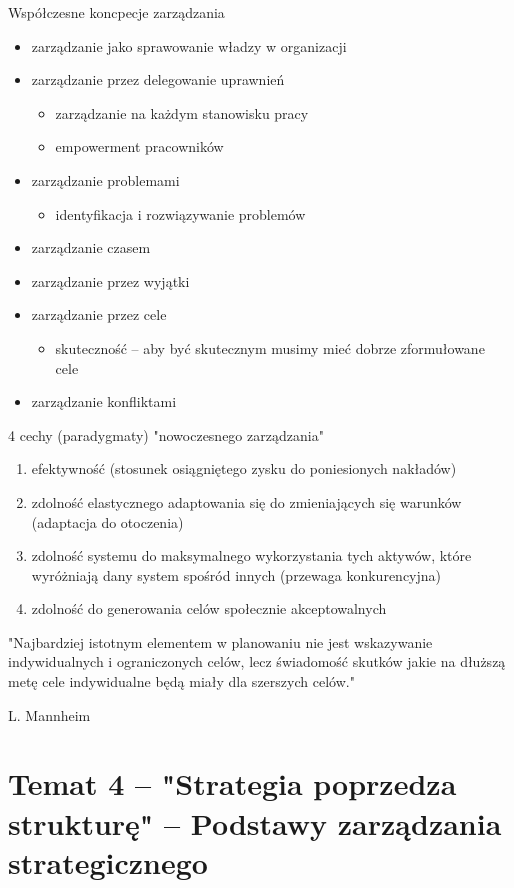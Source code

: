 \documentclass[a4paper,10pt]{report}
\begin{document}
Współczesne koncpecje zarządzania
\begin{itemize}
	\item zarządzanie jako sprawowanie władzy w organizacji
	\item zarządzanie przez delegowanie uprawnień
	\begin{itemize}
		\item zarządzanie na każdym stanowisku pracy
		\item empowerment pracowników
	\end{itemize}
	\item zarządzanie problemami
	\begin{itemize}
		\item identyfikacja i rozwiązywanie problemów
	\end{itemize}
	\item zarządzanie czasem
	\item zarządzanie przez wyjątki
	\item zarządzanie przez cele
	\begin{itemize}
		\item skuteczność -- aby być skutecznym musimy mieć dobrze zformułowane cele
	\end{itemize}
	\item zarządzanie konfliktami
\end{itemize}

4 cechy (paradygmaty) "nowoczesnego zarządzania"
\begin{enumerate}
	\item efektywność (stosunek osiągniętego zysku do poniesionych nakładów)
	\item zdolność elastycznego adaptowania się do zmieniających się warunków (adaptacja do otoczenia)
	\item zdolność systemu do maksymalnego wykorzystania tych aktywów, które wyróżniają dany system spośród innych (przewaga konkurencyjna)
	\item zdolność do generowania celów społecznie akceptowalnych
\end{enumerate}

"Najbardziej istotnym elementem w planowaniu nie jest wskazywanie indywidualnych i ograniczonych celów, lecz świadomość skutków jakie na dłuższą metę cele indywidualne będą miały dla szerszych celów."  
\begin{flushright}
	L. Mannheim
\end{flushright}

\chapter{Temat 4 -- "Strategia poprzedza strukturę" -- Podstawy zarządzania strategicznego}
\end{document}
